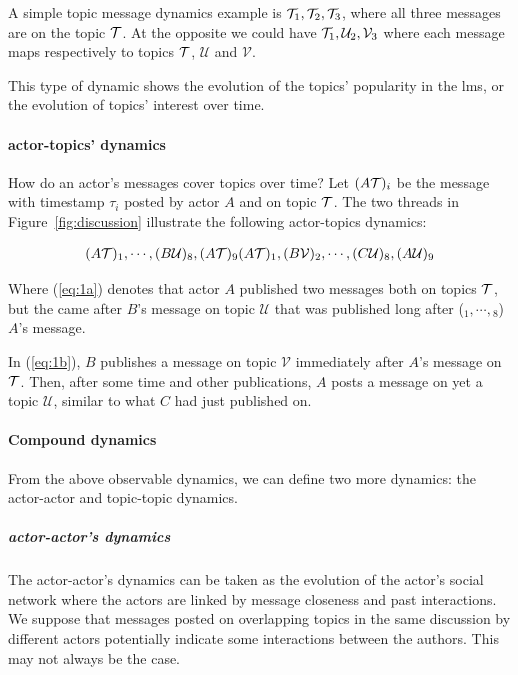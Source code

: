 \documentclass[a4paper,twoside]{article}
\newcommand{\V}{\mathcal{V}}
\newcommand{\U}{\mathcal{U}}
\begin{document}
A simple topic message dynamics example is $\mathcal{T}_1, \mathcal{T}_2, \mathcal{T}_3$, where all three messages are on the topic $\mathcal{T}$.  At the opposite we could have $\T_1, \U_2, \V_3$ where each message maps respectively to topics $\mathcal{T}$, $\U$ and $\V$.

This type of dynamic shows the evolution of the topics' popularity in the \gls{lms}, or the evolution of topics' interest over time.


\paragraph{actor-topics' dynamics}
How do an actor's messages cover topics over time? Let $(A\mathcal{T})_i$ be the message with timestamp $\tau_i$ posted by actor $A$ and on topic $\mathcal{T}$.  The two threads in Figure~\ref{fig:discussion} illustrate the following actor-topics dynamics:


\begin{subequations}
 \begin{align}
  \label{eq:1a}
  (A\T)_1, \cdots{}, (B\U)_8, (A\T)_9
 \end{align}
 \begin{align}
  \label{eq:1b}
  (A\T)_1, (B\V)_2, \cdots{}, (C\U)_8, (A\U)_9
 \end{align}
\end{subequations}

Where (\ref{eq:1a}) denotes that actor $A$ published two messages both on topics $\mathcal{T}$, but the  came after $B$'s message on topic $\U$ that was published long after (${}_1,\cdots, {}_8$) $A$'s  message.

In (\ref{eq:1b}), $B$ publishes a message on topic $\V$ immediately after $A$'s message on $\mathcal{T}$.  Then, after some time and other publications, $A$ posts a message on yet a  topic $\U$, similar to what $C$ had just published on.


\paragraph{Compound dynamics}
From the above observable dynamics, we can define two more dynamics: the actor-actor and topic-topic dynamics.

\subparagraph{actor-actor's dynamics}

The actor-actor's dynamics can be taken as the evolution of the actor's social network where the actors are linked by message closeness and past interactions.  We suppose that messages posted on overlapping topics in the same discussion by different actors potentially indicate some interactions between the authors.   This may not always be the case.
\end{document}
